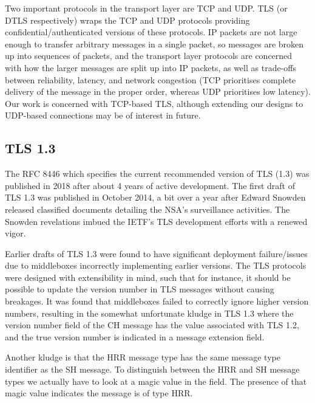 Two important protocols in the transport layer are \ac{TCP} and \ac{UDP}. \ac{TLS} (or \ac{DTLS} respectively) wraps the \ac{TCP} and \ac{UDP} protocols providing confidential/authenticated versions of these protocols. IP packets are not large enough to transfer arbitrary messages in a single packet, so messages are broken up into sequences of packets, and the transport layer protocols are concerned with how the larger messages are split up into IP packets, as well as trade-offs between reliability, latency, and network congestion (TCP prioritises complete delivery of the message in the proper order, whereas UDP prioritises low latency).
Our work is concerned with \ac{TCP}-based \ac{TLS},
although extending our designs to \ac{UDP}-based connections may be of interest in future.

\subsection{TLS 1.3}

The \ac{RFC} 8446 \citep{rfc8446} which specifies the current recommended version of \ac{TLS} (1.3)
was published in 2018 after about 4 years
of active development.
The first draft of \ac{TLS} 1.3 was published
in October 2014, a bit over a year after
Edward Snowden released classified documents
detailing the \ac{NSA}'s surveillance activities.
The Snowden revelations imbued the \ac{IETF}'s
\ac{TLS} development efforts with a renewed vigor.



Earlier drafts of \ac{TLS} 1.3 were found to have significant deployment failure/issues due to middleboxes incorrectly implementing earlier versions.
The \ac{TLS} protocols were designed with
extensibility in mind, such that for instance,
it should be possible to update the version
number in \ac{TLS} messages without causing breakages.
It was found that middleboxes failed to correctly
ignore higher version numbers,
resulting in the somewhat unfortunate kludge
in \ac{TLS} 1.3 where the version number field of the
\ac{CH} message
has the value associated with \ac{TLS} 1.2,
and the true version number is indicated
in a message extension field.

Another kludge is that the \ac{HRR}
message type has the same message type
identifier as the \ac{SH} message.
To distinguish between the \ac{HRR} and \ac{SH} message types we actually
have to look at a magic value in the
 field.
The presence of that magic
value indicates the message is of type \ac{HRR}.


